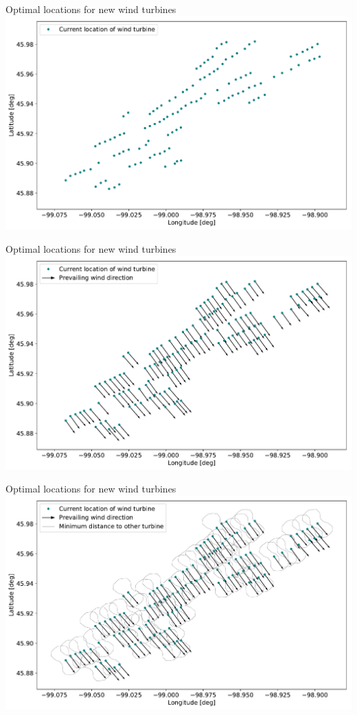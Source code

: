 \documentclass[color=usenames,dvipsnames]{beamer}
\begin{document}
    \begin{frame}{Optimal locations for new wind turbines}
        \includegraphics[width=\textwidth]{../../figures/optimized_cluster-0.pdf}
    \end{frame}

    \begin{frame}{Optimal locations for new wind turbines}
        \includegraphics[width=\textwidth]{../../figures/optimized_cluster-1.pdf}
    \end{frame}

    \begin{frame}{Optimal locations for new wind turbines}
        \includegraphics[width=\textwidth]{../../figures/optimized_cluster-2.pdf}
    \end{frame}
\end{document}

